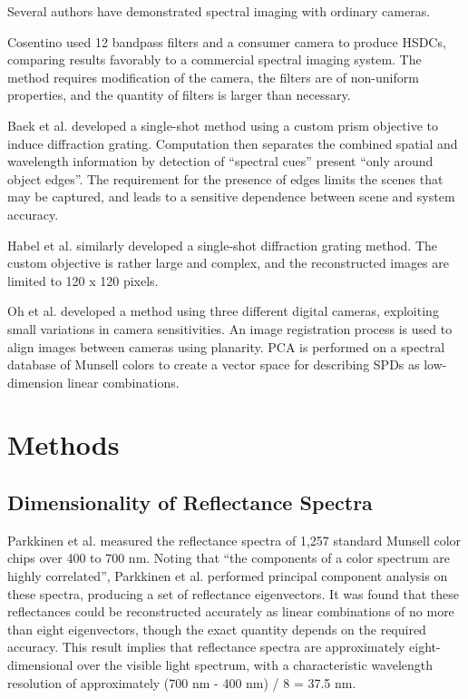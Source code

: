 \documentclass[twocolumn,10pt]{asme2ej}
\newcommand{\id}{\hspace{6 mm}}
\begin{document}
 Several authors have demonstrated spectral imaging with ordinary cameras.

\id Cosentino \cite{Cosentino} used 12 bandpass filters and a consumer camera to produce HSDCs, comparing results favorably to a commercial spectral imaging system. The method requires modification of the camera, the filters are of non-uniform properties, and the quantity of filters is larger than necessary.

\id Baek et al. \cite{Baek} developed a single-shot method using a custom prism objective to induce diffraction grating. Computation then separates the combined spatial and wavelength information by detection of ``spectral cues'' present ``only around object edges''. The requirement for the presence of edges limits the scenes that may be captured, and leads to a sensitive dependence between scene and system accuracy.

\id Habel et al. \cite{Habel} similarly developed a single-shot diffraction grating method. The custom objective is rather large and complex, and the reconstructed images are limited to 120 x 120 pixels.

\id Oh et al. \cite{Oh} developed a method using three different digital cameras, exploiting small variations in camera sensitivities. An image registration process is used to align images between cameras using planarity. PCA is performed on a spectral database of Munsell colors to create a vector space for describing SPDs as low-dimension linear combinations.

\section{Methods}

\subsection{Dimensionality of Reflectance Spectra}

Parkkinen et al. \cite{Parkkinen} measured the reflectance spectra of 1,257 standard Munsell color chips over 400 to 700 nm. Noting that ``the components of a color spectrum are highly correlated'', Parkkinen et al. performed principal component analysis on these spectra, producing a set of reflectance eigenvectors. It was found that these reflectances could be reconstructed accurately as linear combinations of no more than eight eigenvectors, though the exact quantity depends on the required accuracy. This result implies that reflectance spectra are approximately eight-dimensional over the visible light spectrum, with a characteristic wavelength resolution of approximately (700 nm - 400 nm) / 8 = 37.5 nm.
\end{document}
